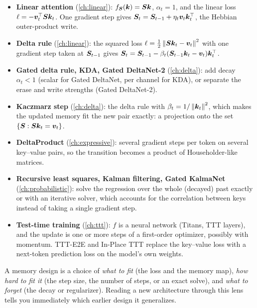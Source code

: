 \begin{itemize}
  \item \textbf{Linear attention} (\cref{ch:linear}): $f_{\bm{S}}(\bm{k})=\bm{S}\bm{k}$, $\alpha_t=1$, and
    the linear loss $\ell = -\bm{v}_t^{\top}\bm{S}\bm{k}_t$. One gradient step gives
    $\bm{S}_t = \bm{S}_{t-1} + \eta_t\bm{v}_t\bm{k}_t^{\top}$, the Hebbian outer-product write.
  \item \textbf{Delta rule} (\cref{ch:linear}): the squared loss
    $\ell=\tfrac12\left\lVert \bm{S}\bm{k}_t-\bm{v}_t\right\rVert^2$ with one gradient step taken at $\bm{S}_{t-1}$ gives
    $\bm{S}_t = \bm{S}_{t-1} - \beta_t(\bm{S}_{t-1}\bm{k}_t-\bm{v}_t)\bm{k}_t^{\top}$.
  \item \textbf{Gated delta rule, KDA, Gated DeltaNet-2} (\cref{ch:delta}): add decay
    $\alpha_t<1$ (scalar for Gated DeltaNet, per channel for KDA), or separate the erase and
    write strengths (Gated DeltaNet-2).
  \item \textbf{Kaczmarz step} (\cref{ch:delta}): the delta rule with
    $\beta_t = 1/\left\lVert \bm{k}_t\right\rVert^2$, which makes the updated memory fit the new pair exactly:
    a projection onto the set $\{\bm{S} : \bm{S}\bm{k}_t=\bm{v}_t\}$.
  \item \textbf{DeltaProduct} (\cref{ch:expressive}): several gradient steps per token on
    several key--value pairs, so the transition becomes a product of Householder-like
    matrices.
  \item \textbf{Recursive least squares, Kalman filtering, Gated KalmaNet}
    (\cref{ch:probabilistic}): solve the regression over the whole (decayed) past exactly or
    with an iterative solver, which accounts for the correlation between keys instead of
    taking a single gradient step.
  \item \textbf{Test-time training} (\cref{ch:ttt}): $f$ is a neural network (Titans, TTT
    layers), and the update is one or more steps of a first-order optimizer, possibly with
    momentum. TTT-E2E and In-Place TTT replace the key--value loss with a next-token
    prediction loss on the model's own weights.
\end{itemize}

\begin{keyidea}
A memory design is a choice of \emph{what to fit} (the loss and the memory map), \emph{how
hard to fit it} (the step size, the number of steps, or an exact solve), and \emph{what to
forget} (the decay or regularizer). Reading a new architecture through this lens tells you
immediately which earlier design it generalizes.
\end{keyidea}

